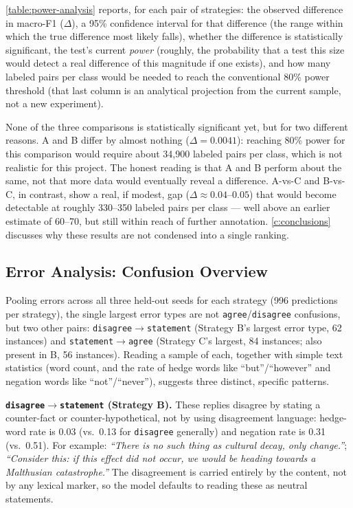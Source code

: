 \autoref{table:power-analysis} reports, for each pair of strategies: the
observed difference in macro-F1 ($\Delta$), a 95\% confidence interval
for that difference (the range within which the true difference most
likely falls), whether the difference is statistically significant, the
test's current \emph{power} (roughly, the probability that a test this
size would detect a real difference of this magnitude if one exists),
and how many labeled pairs per class would be needed to reach the
conventional 80\% power threshold (that last column is an analytical
projection from the current sample, not a new experiment).

None of the three comparisons is statistically significant yet, but for
two different reasons. A and B differ by almost nothing ($\Delta =
0.0041$): reaching 80\% power for this comparison would require about
34,900 labeled pairs per class, which is not realistic for this project.
The honest reading is that A and B perform about the same, not that more
data would eventually reveal a difference. A-vs-C and B-vs-C, in
contrast, show a real, if modest, gap ($\Delta \approx 0.04$--$0.05$)
that would become detectable at roughly 330--350 labeled pairs per
class --- well above an earlier estimate of 60--70, but still within
reach of further annotation. \autoref{c:conclusions} discusses why these
results are not condensed into a single ranking.

\subsection{Error Analysis: Confusion Overview}
\label{sec:error-overview}

Pooling errors across all three held-out seeds for each strategy (996
predictions per strategy), the single largest error types are not
\texttt{agree}/\texttt{disagree} confusions, but two other pairs:
\texttt{disagree}$\to$\texttt{statement} (Strategy B's largest error
type, 62 instances) and \texttt{statement}$\to$\texttt{agree} (Strategy
C's largest, 84 instances; also present in B, 56 instances). Reading a
sample of each, together with simple text statistics (word count, and
the rate of hedge words like ``but''/``however'' and negation words like
``not''/``never''), suggests three distinct, specific patterns.

\textbf{\texttt{disagree}$\to$\texttt{statement} (Strategy B).} These
replies disagree by stating a counter-fact or counter-hypothetical, not
by using disagreement language: hedge-word rate is 0.03 (vs.\ 0.13 for
\texttt{disagree} generally) and negation rate is 0.31 (vs.\ 0.51).
For example: \emph{``There is no such thing as cultural decay, only
change.''}; \emph{``Consider this: if this effect did not occur, we
would be heading towards a Malthusian catastrophe.''} The disagreement
is carried entirely by the content, not by any lexical marker, so the
model defaults to reading these as neutral statements.

